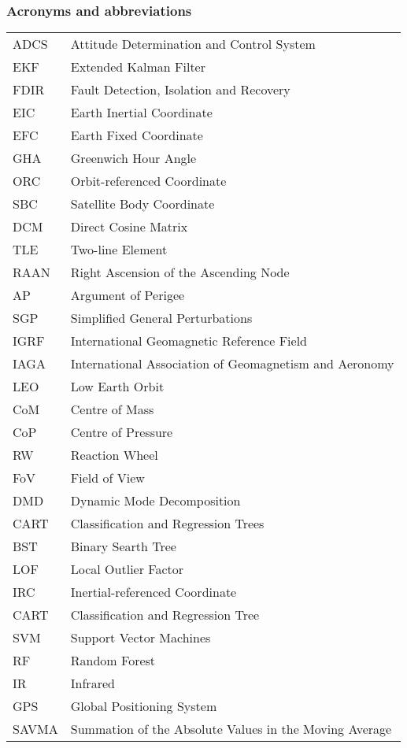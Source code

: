 \newpage
\subsubsection*{Acronyms and abbreviations}

\begingroup
\renewcommand{\arraystretch}{1.2}
\begin{tabular}{@{}p{2.5cm} l}
    ADCS	& Attitude Determination and Control System \\
    EKF		& Extended Kalman Filter \\
    FDIR	& Fault Detection, Isolation and Recovery \\
    EIC		& Earth Inertial Coordinate \\
    EFC		& Earth Fixed Coordinate \\
    GHA 	& Greenwich Hour Angle \\
    ORC 	& Orbit-referenced Coordinate \\
    SBC 	& Satellite Body Coordinate \\
    DCM 	& Direct Cosine Matrix \\
    TLE 	& Two-line Element \\
    RAAN	& Right Ascension of the Ascending Node \\
    AP		& Argument of Perigee \\
    SGP 	& Simplified General Perturbations \\
    IGRF	& International Geomagnetic Reference Field \\
    IAGA	& International Association of Geomagnetism and Aeronomy \\
    LEO		& Low Earth Orbit \\
    CoM		& Centre of Mass \\
    CoP 	& Centre of Pressure \\
    RW		& Reaction Wheel \\
    FoV		& Field of View \\
    DMD 	& Dynamic Mode Decomposition \\    
    CART	& Classification and Regression Trees \\
    BST		& Binary Searth Tree \\
    LOF		& Local Outlier Factor \\
    IRC		& Inertial-referenced Coordinate \\
    CART	& Classification and Regression Tree \\
    SVM		& Support Vector Machines \\
    RF		& Random Forest \\
    IR		& Infrared \\
    GPS		& Global Positioning System \\
    SAVMA	& Summation of the Absolute Values in the Moving Average \\
    
\end{tabular}
\endgroup
